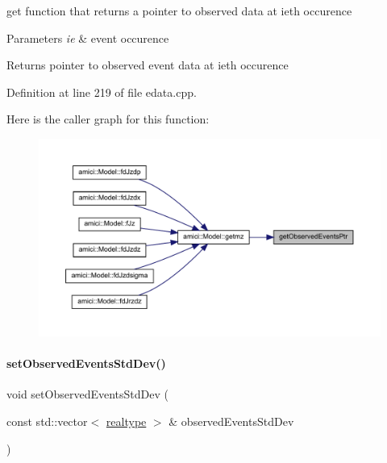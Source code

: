 get function that returns a pointer to observed data at ieth occurence


\begin{DoxyParams}{Parameters}
{\em ie} & event occurence \\
\hline
\end{DoxyParams}
\begin{DoxyReturn}{Returns}
pointer to observed event data at ieth occurence 
\end{DoxyReturn}


Definition at line 219 of file edata.\+cpp.

Here is the caller graph for this function\+:
\nopagebreak
\begin{figure}[H]
\begin{center}
\leavevmode
\includegraphics[width=350pt]{classamici_1_1_exp_data_a95ab3fe91af62612f202fdc6cd033d2a_icgraph}
\end{center}
\end{figure}
\mbox{\label{classamici_1_1_exp_data_af55c1775810031cd4b6e283f6dd220be}} 
\paragraph{\texorpdfstring{setObservedEventsStdDev()}{setObservedEventsStdDev()}\hspace{0.1cm}{\footnotesize\ttfamily [1/4]}}
{\footnotesize\ttfamily void set\+Observed\+Events\+Std\+Dev (\begin{DoxyParamCaption}\item[{const std\+::vector$<$ \mbox{\hyperlink{namespaceamici_a1bdce28051d6a53868f7ccbf5f2c14a3}{realtype}} $>$ \&}]{observed\+Events\+Std\+Dev }\end{DoxyParamCaption})}

